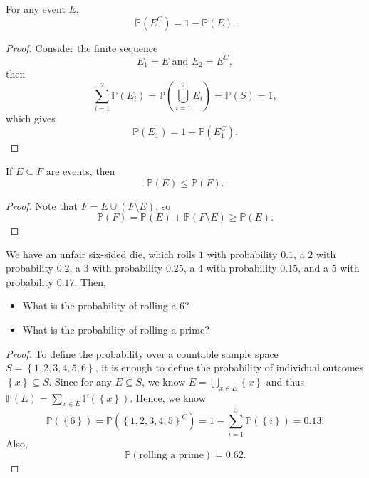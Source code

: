 \begin{proposition}
    For any event \(E\), 
    \[
        \mathbb{P} \left( E^C \right) = 1 - \mathbb{P} (E). 
    \] 
\end{proposition}

\begin{proof}
    Consider the finite sequence 
    \[
        E_1 = E \text{ and } E_2 = E^C, 
    \]
    then 
    \[
         \sum_{i=1}^2 \mathbb{P} (E_i) = \mathbb{P} \left( \bigcup_{i=1}^{2} E_i  \right) = \mathbb{P} (S) = 1, 
    \]
    which gives 
    \[
        \mathbb{P} (E_1) = 1 - \mathbb{P} \left( E_1^C \right). 
    \]
\end{proof}

\begin{proposition}[Monotonity]
    If \(E \subseteq F\) are events, then 
    \[
        \mathbb{P} (E) \le \mathbb{P} (F).
    \] 
\end{proposition}

\begin{proof}
    Note that \(F = E \cup \left( F \setminus E \right) \), so 
    \[
        \mathbb{P} (F) = \mathbb{P} (E) + \mathbb{P} (F \setminus E) \ge \mathbb{P} (E).
    \] 
\end{proof}

\begin{eg}
    We have an unfair six-sided die, which rolls \(1\) with probability \(0.1\), a \(2\) with probability \(0.2\), a \(3\) with probability \(0.25\), a \(4\) with probability \(0.15\), and a \(5\) with probability \(0.17\). Then, 
    \begin{itemize}
        \item [(a)] What is the probability of rolling a \(6\)? 
        \item [(b)] What is the probability of rolling a prime? 
    \end{itemize}         
\end{eg}
\begin{proof}
    To define the probability over a countable sample space \(S = \left\{ 1, 2, 3, 4, 5, 6 \right\} \), it is enough to define the probability of individual outcomes \(\left\{ x \right\} \subseteq S \). Since for any \(E \subseteq S\), we know \(E = \bigcup_{x \in E}\left\{ x \right\}  \) and thus \(\mathbb{P} (E) = \sum_{x \in E} \mathbb{P} \left( \left\{ x \right\}  \right)  \). Hence, we know 
    \[
        \mathbb{P} (\left\{ 6 \right\} ) = \mathbb{P} \left( \left\{ 1,2,3,4,5 \right\}^C  \right) = 1 - \sum_{i=1}^5 \mathbb{P} \left( \left\{ i \right\}  \right) = 0.13.    
    \]
    Also, 
    \[
        \mathbb{P} (\text{rolling a prime} ) = 0.62.
    \]   
\end{proof}


